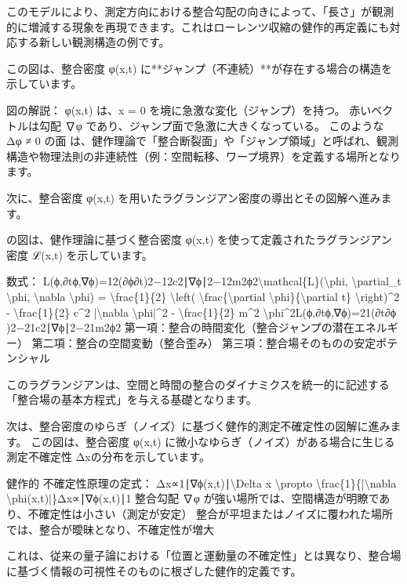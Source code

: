 \documentclass{article}
\begin{document}
このモデルにより、測定方向における整合勾配の向きによって、「長さ」が観測的に増減する現象を再現できます。これはローレンツ収縮の健作的再定義にも対応する新しい観測構造の例です。

この図は、整合密度 φ(x,t) に**ジャンプ（不連続）**が存在する場合の構造を示しています。

図の解説：
φ(x,t) は、x = 0 を境に急激な変化（ジャンプ）を持つ。
赤いベクトルは勾配 ∇φ であり、ジャンプ面で急激に大きくなっている。
このような Δφ ≠ 0 の面 は、健作理論で「整合断裂面」や「ジャンプ領域」と呼ばれ、観測構造や物理法則の非連続性（例：空間転移、ワープ境界）を定義する場所となります。

次に、整合密度 φ(x,t) を用いたラグランジアン密度の導出とその図解へ進みます。 

の図は、健作理論に基づく整合密度 φ(x,t) を使って定義されたラグランジアン密度 ℒ(x,t) を示しています。

数式：
L(ϕ,∂tϕ,∇ϕ)=12(∂ϕ∂t)2−12c2∣∇ϕ∣2−12m2ϕ2\textbackslash{}mathcal\{L\}(\textbackslash{}phi, \textbackslash{}partial\_t \textbackslash{}phi, \textbackslash{}nabla \textbackslash{}phi) = \textbackslash{}frac\{1\}\{2\} \textbackslash{}left( \textbackslash{}frac\{\textbackslash{}partial \textbackslash{}phi\}\{\textbackslash{}partial t\} \textbackslash{}right)\textasciicircum{}2 - \textbackslash{}frac\{1\}\{2\} c\textasciicircum{}2 |\textbackslash{}nabla \textbackslash{}phi|\textasciicircum{}2 - \textbackslash{}frac\{1\}\{2\} m\textasciicircum{}2 \textbackslash{}phi\textasciicircum{}2L(ϕ,∂t​ϕ,∇ϕ)=21​(∂t∂ϕ​)2−21​c2∣∇ϕ∣2−21​m2ϕ2 
第一項：整合の時間変化（整合ジャンプの潜在エネルギー）
第二項：整合の空間変動（整合歪み）
第三項：整合場そのものの安定ポテンシャル

このラグランジアンは、空間と時間の整合のダイナミクスを統一的に記述する「整合場の基本方程式」を与える基礎となります。

次は、整合密度のゆらぎ（ノイズ）に基づく健作的測定不確定性の図解に進みます。 
この図は、整合密度 φ(x,t) に微小なゆらぎ（ノイズ）がある場合に生じる測定不確定性 Δxの分布を示しています。

健作的 不確定性原理の定式：
Δx∝1∣∇ϕ(x,t)∣\textbackslash{}Delta x \textbackslash{}propto \textbackslash{}frac\{1\}\{|\textbackslash{}nabla \textbackslash{}phi(x,t)|\}Δx∝∣∇ϕ(x,t)∣1​ 
整合勾配 ∇φ が強い場所では、空間構造が明瞭であり、不確定性は小さい（測定が安定）
整合が平坦またはノイズに覆われた場所では、整合が曖昧となり、不確定性が増大

これは、従来の量子論における「位置と運動量の不確定性」とは異なり、整合場に基づく情報の可視性そのものに根ざした健作的定義です。
\end{document}
